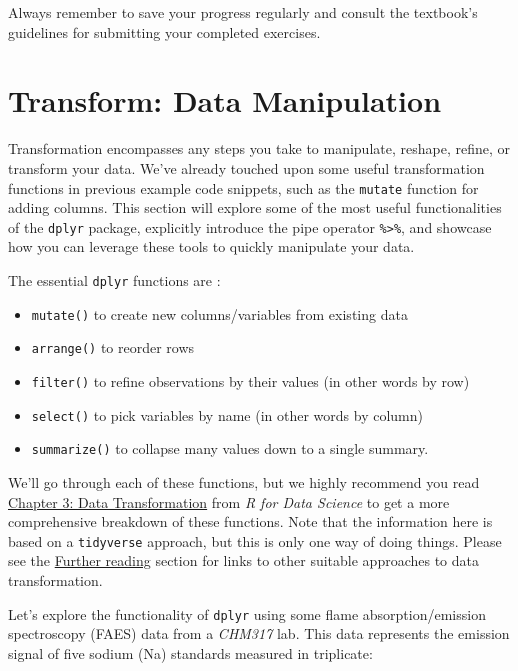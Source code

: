 \documentclass[
]{book}
\providecommand{\tightlist}{%
  \setlength{\itemsep}{0pt}\setlength{\parskip}{0pt}}
\begin{document}
Always remember to save your progress regularly and consult the textbook's guidelines for submitting your completed exercises.

\hypertarget{transform-data-manipulation}{%
\chapter{Transform: Data Manipulation}\label{transform-data-manipulation}}

Transformation encompasses any steps you take to manipulate, reshape, refine, or transform your data. We've already touched upon some useful transformation functions in previous example code snippets, such as the \texttt{mutate} function for adding columns. This section will explore some of the most useful functionalities of the \texttt{dplyr} package, explicitly introduce the pipe operator \texttt{\%\textgreater{}\%}, and showcase how you can leverage these tools to quickly manipulate your data.

The essential \texttt{dplyr} functions are :

\begin{itemize}
\tightlist
\item
  \texttt{mutate()} to create new columns/variables from existing data
\item
  \texttt{arrange()} to reorder rows
\item
  \texttt{filter()} to refine observations by their values (in other words by row)
\item
  \texttt{select()} to pick variables by name (in other words by column)
\item
  \texttt{summarize()} to collapse many values down to a single summary.
\end{itemize}

We'll go through each of these functions, but we highly recommend you read \href{https://r4ds.had.co.nz/transform.html}{Chapter 3: Data Transformation} from \emph{R for Data Science} to get a more comprehensive breakdown of these functions. Note that the information here is based on a \texttt{tidyverse} approach, but this is only one way of doing things. Please see the \protect\hyperlink{further-reading}{Further reading} section for links to other suitable approaches to data transformation.

Let's explore the functionality of \texttt{dplyr} using some flame absorption/emission spectroscopy (FAES) data from a \emph{CHM317} lab. This data represents the emission signal of five sodium (Na) standards measured in triplicate:
\end{document}
